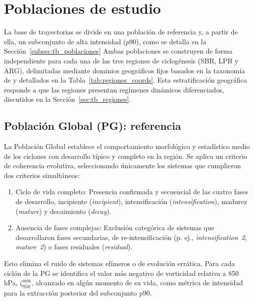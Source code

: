 \section{Poblaciones de estudio}\label{sec:poblaciones_estudio}

La base de trayectorias se divide en una población de referencia y, a partir de ella, un subconjunto de alta intensidad ($p90$), como se detalla en la Sección~\ref{subsec:tb_poblaciones}
Ambas poblaciones se construyen de forma independiente para cada una de las tres regiones de ciclogénesis (SBR, LPB y ARG), delimitadas mediante dominios geográficos fijos basados en la taxonomía de \citet{gramcianinov2019properties} y detallados en la Tabla~\ref{tab:regiones_coords}.
Esta estratificación geográfica responde a que las regiones presentan regímenes dinámicos diferenciados, discutidos en la Sección~\ref{sec:tb_regiones}.



\subsection{Población Global (PG): referencia}\label{subsec:grupo_global}

La Población Global establece el comportamiento morfológico y estadístico medio de los ciclones con desarrollo típico y completo en la región.
Se aplica un criterio de coherencia evolutiva, seleccionando únicamente los sistemas que cumplieron dos criterios simultáneos:

\begin{enumerate}
    \item Ciclo de vida completo: Presencia confirmada y secuencial de las cuatro fases de desarrollo, incipiente (\textit{incipient}), intensificación (\textit{intensification}), madurez (\textit{mature}) y decaimiento (\textit{decay}).
    \item Ausencia de fases complejas: Exclusión categórica de sistemas que desarrollaron fases secundarias, de re-intensificación (p. ej., \textit{intensification~2}, \textit{mature~2}) o fases residuales (\textit{residual}).
\end{enumerate}

Esto elimina el ruido de sistemas efímeros o de evolución errática.
Para cada ciclón de la PG se identifica el valor más negativo de vorticidad relativa a 850 hPa, $\zeta_{850}^{\min}$, alcanzado en algún momento de su vida, como métrica de intensidad para la extracción posterior del subconjunto p90.

